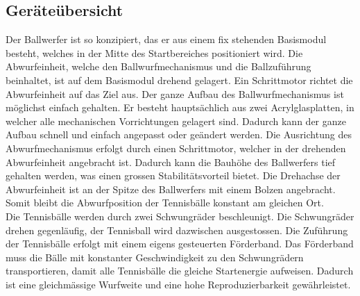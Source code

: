\subsection{Geräteübersicht}
Der Ballwerfer ist so konzipiert, das er aus einem fix stehenden Basismodul besteht, 
welches in der Mitte des Startbereiches positioniert wird. Die Abwurfeinheit, 
welche den Ballwurfmechanismus und die Ballzuführung beinhaltet, ist auf dem Basismodul drehend gelagert. 
Ein Schrittmotor richtet die Abwurfeinheit auf das Ziel aus. Der ganze Aufbau des Ballwurfmechanismus ist möglichst einfach gehalten. 
Er besteht hauptsächlich aus zwei Acrylglasplatten, in welcher alle mechanischen Vorrichtungen gelagert sind. 
Dadurch kann der ganze Aufbau schnell und einfach angepasst oder geändert werden. 
Die Ausrichtung des Abwurfmechanismus erfolgt durch einen Schrittmotor, welcher in der drehenden Abwurfeinheit angebracht ist. 
Dadurch kann die Bauhöhe des Ballwerfers tief gehalten werden, was einen grossen Stabilitätsvorteil bietet. 
Die Drehachse der Abwurfeinheit ist an der Spitze des Ballwerfers mit einem Bolzen angebracht. 
Somit bleibt die Abwurfposition der Tennisbälle konstant am gleichen Ort.\\
Die Tennisbälle werden durch zwei Schwungräder beschleunigt. Die Schwungräder drehen gegenläufig, 
der Tennisball wird dazwischen ausgestossen. Die Zuführung der Tennisbälle erfolgt mit einem eigens gesteuerten Förderband. 
Das Förderband muss die Bälle mit konstanter Geschwindigkeit zu den Schwungrädern transportieren, 
damit alle Tennisbälle die gleiche Startenergie aufweisen. 
Dadurch ist eine gleichmässige Wurfweite und eine hohe Reproduzierbarkeit gewährleistet. \\
